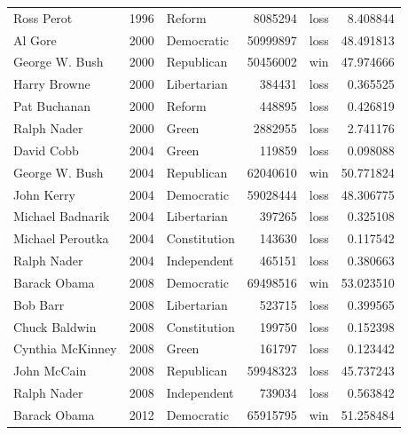 \documentclass[
  letterpaper,
  DIV=11,
  numbers=noendperiod]{scrreprt}
\begin{document}
\begin{tabular}{lrlrlr}
Ross Perot             &  1996 &                 Reform &       8085294 &   loss &   8.408844 \\
Al Gore                &  2000 &             Democratic &      50999897 &   loss &  48.491813 \\
George W. Bush         &  2000 &             Republican &      50456002 &    win &  47.974666 \\
Harry Browne           &  2000 &            Libertarian &        384431 &   loss &   0.365525 \\
Pat Buchanan           &  2000 &                 Reform &        448895 &   loss &   0.426819 \\
Ralph Nader            &  2000 &                  Green &       2882955 &   loss &   2.741176 \\
David Cobb             &  2004 &                  Green &        119859 &   loss &   0.098088 \\
George W. Bush         &  2004 &             Republican &      62040610 &    win &  50.771824 \\
John Kerry             &  2004 &             Democratic &      59028444 &   loss &  48.306775 \\
Michael Badnarik       &  2004 &            Libertarian &        397265 &   loss &   0.325108 \\
Michael Peroutka       &  2004 &           Constitution &        143630 &   loss &   0.117542 \\
Ralph Nader            &  2004 &            Independent &        465151 &   loss &   0.380663 \\
Barack Obama           &  2008 &             Democratic &      69498516 &    win &  53.023510 \\
Bob Barr               &  2008 &            Libertarian &        523715 &   loss &   0.399565 \\
Chuck Baldwin          &  2008 &           Constitution &        199750 &   loss &   0.152398 \\
Cynthia McKinney       &  2008 &                  Green &        161797 &   loss &   0.123442 \\
John McCain            &  2008 &             Republican &      59948323 &   loss &  45.737243 \\
Ralph Nader            &  2008 &            Independent &        739034 &   loss &   0.563842 \\
Barack Obama           &  2012 &             Democratic &      65915795 &    win &  51.258484 \\

\end{tabular}
\end{document}
